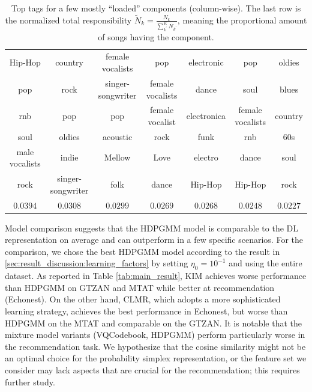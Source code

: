 \documentclass{article}
\begin{document}
\begin{table}[hbt!]
\centering
\small
\begin{tabular}{ ccccccc }
    \hline
    Hip-Hop & country & female vocalists & pop & electronic & pop & oldies \\
    pop & rock & singer-songwriter & female vocalists & dance & soul & blues \\
    rnb & pop & pop & female vocalist & electronica & female vocalists & country \\
    soul & oldies & acoustic & rock & funk & rnb & 60s \\
    male vocalists & indie & Mellow & Love & electro & dance & soul \\
    rock & singer-songwriter & folk & dance & Hip-Hop & Hip-Hop & rock \\
    \hline
    $0.0394$ & $0.0308$ & $0.0299$ & $0.0269$ & $0.0268$ & $0.0248$ & $0.0227$ \\
    \hline
\end{tabular}
\caption{Top tags for a few mostly ``loaded'' components (column-wise). The last row is the normalized total responsibility $\tilde{N}_{k} = \frac{N_{k}}{\sum_{k^{\prime}}^{K} N_{k^{\prime}}}$, meaning the proportional amount of songs having the component.}
\vspace{-0.3cm}
\label{tab:topic_tags}
\end{table}

Model comparison suggests that the HDPGMM model is comparable to the DL representation on average and can outperform in a few specific scenarios. For the comparison, we chose the best HDPGMM model according to the result in \ref{sec:result_discussion:learning_factors} by setting $\eta_{0}=10^{-1}$ and using the entire dataset. As reported in Table \ref{tab:main_result}, KIM achieves worse performance than HDPGMM on GTZAN and MTAT while better at recommendation (Echonest). On the other hand, CLMR, which adopts a more sophisticated learning strategy, achieves the best performance in Echonest, but worse than HDPGMM on the MTAT and comparable on the GTZAN. It is notable that the mixture model variants (VQCodebook, HDPGMM) perform particularly worse in the recommendation task. We hypothesize that the cosine similarity might not be an optimal choice for the probability simplex representation, or the feature set we consider may lack aspects that are crucial for the recommendation; this requires further study.
\end{document}
